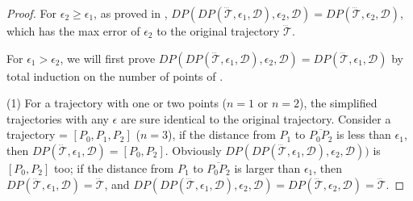 \begin{proof}
	For $\epsilon_2 \ge \epsilon_1$, as proved in \cite{Cao:Spatio}, $DP(DP(\dddot{\mathcal{T}}, \epsilon_1, \mathcal{D}), \epsilon_2, \mathcal{D}) = DP(\dddot{\mathcal{T}}, \epsilon_2, \mathcal{D})$, which has the max error of $\epsilon_2$ to the original trajectory $\dddot{\mathcal{T}}$.
	
	For $\epsilon_1 > \epsilon_2$, we will first prove $DP(DP(\dddot{\mathcal{T}}, \epsilon_1, \mathcal{D}), \epsilon_2, \mathcal{D}) = DP(\dddot{\mathcal{T}}, \epsilon_1, \mathcal{D})$ by total induction on the number of points of .
	
	(1)  For a trajectory  with one or two points ($n=1$ or $n=2$), the simplified trajectories with any $\epsilon$ are sure identical to the original trajectory. 
	Consider a trajectory  =	$[P_0, P_1, P_2]$ ($n = 3$),
	if the distance from $P_1$ to $\overline{P_0P_2}$ is less than $\epsilon_1$, then $DP(\dddot{\mathcal{T}}, \epsilon_1, \mathcal{D}) = [P_0, P_2]$. Obviously $DP(DP(\dddot{\mathcal{T}}, \epsilon_1, \mathcal{D}), \epsilon_2, \mathcal{D}))$ is $[P_0, P_2]$ too;	 
	if the distance from $P_1$ to $\overline{P_0P_2}$ is larger than $\epsilon_1$, then $DP(\dddot{\mathcal{T}}, \epsilon_1, \mathcal{D})=\dddot{\mathcal{T}}$, and $DP(DP(\dddot{\mathcal{T}}, \epsilon_1, \mathcal{D}), \epsilon_2, \mathcal{D}) = DP(\dddot{\mathcal{T}}, \epsilon_2, \mathcal{D})=\dddot{\mathcal{T}}$.


\end{proof}
